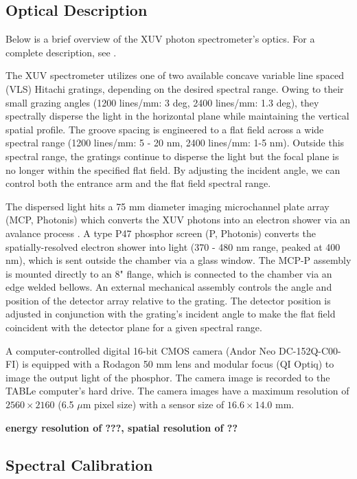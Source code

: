 \subsection{Optical Description}

Below is a brief overview of the XUV photon spectrometer's optics. For a complete description, see \cite{hagemanComplexAttosecondTransientAbsorption2020}.

The XUV spectrometer utilizes one of two available concave variable line spaced (VLS) Hitachi gratings, depending on the desired spectral range. Owing to their small grazing angles (1200 lines/mm: 3 deg, 2400 lines/mm: 1.3 deg), they spectrally disperse the light in the horizontal plane while maintaining the vertical spatial profile. The groove spacing is engineered to a flat field across a wide spectral range (1200 lines/mm: 5 - 20 nm, 2400 lines/mm: 1-5 nm). Outside this spectral range, the gratings continue to disperse the light but the focal plane is no longer within the specified flat field. By adjusting the incident angle, we can control both the entrance arm and the flat field spectral range.

The dispersed light hits a 75 mm diameter imaging microchannel plate array (MCP, Photonis) which converts the XUV photons into an electron shower via an avalance process \cite{ladislaswizaMicrochannelPlateDetectors1979a,fraserGrayImagingUsing1984}. A type P47 phosphor screen (P, Photonis) converts the spatially-resolved electron shower into light (370 - 480 nm range, peaked at 400 nm), which is sent outside the chamber via a glass window. The MCP-P assembly is mounted directly to an 8" flange, which is connected to the chamber via an edge welded bellows. An external mechanical assembly controls the angle and position of the detector array relative to the grating. The detector position is adjusted in conjunction with the grating's incident angle to make the flat field coincident with the detector plane for a given spectral range.

A computer-controlled digital 16-bit CMOS camera (Andor Neo DC-152Q-C00-FI) is equipped with a Rodagon 50 mm lens and modular focus (QI Optiq) to image the output light of the phosphor. The camera image is recorded to the TABLe computer's hard drive. The camera images have a maximum resolution of $2560 \times 2160$ (6.5 $\mu$m pixel size) with a sensor size of $16.6 \times 14.0$ mm.

\textbf{energy resolution of ???, spatial resolution of ??}

\subsection{Spectral Calibration}

